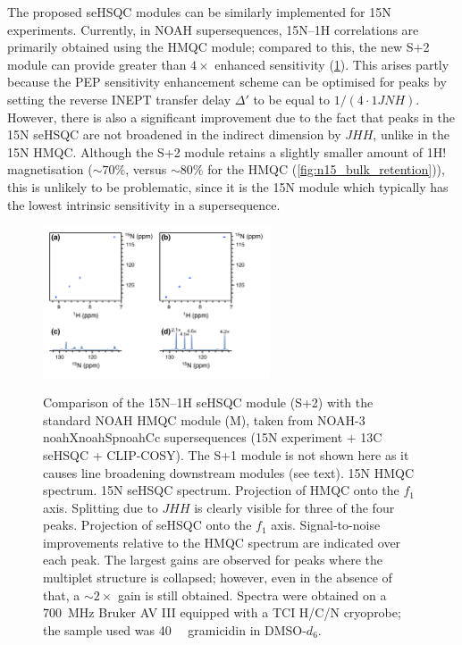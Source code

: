 \documentclass[11pt]{article}
\newcommand*{\noahthree}[3]{\csname noah#1\endcsname\csname noah#2\endcsname\csname noah#3\endcsname}
\newcommand*{\noahM}{M}
\newcommand*{\noahSpa}{S+1}
\newcommand*{\noahSpb}{S+2}
\newcommand*{\carbon}{13C}
\newcommand*{\proton}{1H}
\newcommand*{\nitrogen}{15N}
\newcommand*{\onejnh}{1JNH}
\newcommand*{\magnnot}[1]{1H!#1}
\newcommand*{\jhh}{JHH}
\newcommand*{\grami}{Spectra were obtained on a \SI{700}{\MHz} Bruker AV III equipped with a TCI H/C/N cryoprobe; the sample used was \SI{40}{\milli\molar} gramicidin in DMSO-$d_6$.}
\begin{document}
\begin{refsection}
The proposed seHSQC modules can be similarly implemented for \nitrogen{} experiments.
Currently, in NOAH supersequences, \nitrogen{}--\proton{} correlations are primarily obtained using the HMQC module;\autocite{Kupce2007MRC, Kupce2017ACIE} compared to this, the new \noahSpb{} module can provide greater than $4\times$ enhanced sensitivity (\cref{fig:15n_spv2vsm}).
This arises partly because the PEP sensitivity enhancement scheme can be optimised for  peaks by setting the reverse INEPT transfer delay $\Delta'$ to be equal to $1/(4 \cdot\onejnh)$.
However, there is also a significant improvement due to the fact that peaks in the \nitrogen{} seHSQC are not broadened in the indirect dimension by $\jhh$, unlike in the \nitrogen{} HMQC.
Although the \noahSpb{} module retains a slightly smaller amount of \magnnot{} magnetisation ($\sim 70\%$, versus $\sim 80\%$ for the HMQC (\cref{fig:n15_bulk_retention})), this is unlikely to be problematic, since it is the \nitrogen{} module which typically has the lowest intrinsic sensitivity in a supersequence.

\begin{figure}
    \centering
    \includegraphics[width=0.6\textwidth]{15n_spv2vsm.png}
    {\label{fig:15n_spv2vsm_hmqc}}
    {\label{fig:15n_spv2vsm_spv2}}
    {\label{fig:15n_spv2vsm_hmqc_proj}}
    {\label{fig:15n_spv2vsm_spv2_proj}}
    \caption{
        Comparison of the \nitrogen{}--\proton{} seHSQC module (\noahSpb{}) with the standard NOAH HMQC module (\noahM{}), taken from NOAH-3 \noahthree{X}{Sp}{Cc} supersequences (\nitrogen{} experiment + \carbon{} seHSQC + CLIP-COSY).
        The \noahSpa{} module is not shown here as it causes line broadening downstream modules (see text).
        \textbf{} \nitrogen{} HMQC spectrum.
        \textbf{} \nitrogen{} seHSQC spectrum.
        \textbf{} Projection of HMQC onto the $f_1$ axis.
        Splitting due to $\jhh$ is clearly visible for three of the four peaks.
        \textbf{} Projection of seHSQC onto the $f_1$ axis.
        Signal-to-noise improvements relative to the HMQC spectrum are indicated over each peak.
        The largest gains are observed for peaks where the multiplet structure is collapsed; however, even in the absence of that, a $\sim 2\times$ gain is still obtained.
        \grami{}
    }
    \label{fig:15n_spv2vsm}
\end{figure}


\end{refsection}
\end{document}
